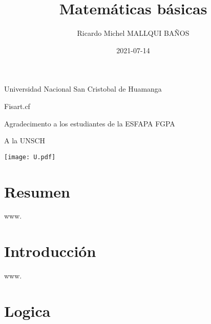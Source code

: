 \documentclass[16pt,]{krantz}
\title{Matemáticas básicas}
\author{Ricardo Michel MALLQUI BAÑOS}
\institute{Universidad Nacional San Cristóbal De Huamanga}
\date{2021-07-14}
\theoremstyle{definition}
\theoremstyle{definition}
\theoremstyle{definition}
\theoremstyle{definition}
\theoremstyle{remark}
\begin{document}
\maketitle

\thispagestyle{empty}
\begin{flushright}
Universidad Nacional San Cristobal de Huamanga

Fisart.cf

Agradecimento a los estudiantes de la ESFAPA FGPA

A la UNSCH

\texttt{[image: U.pdf]}
\end{flushright}

{
\hypersetup{linkcolor=}
\setcounter{tocdepth}{2}
\tableofcontents
}
\listoftables
\listoffigures
\newcommand{\N}{\mathbb{N}}
\newcommand{\R}{\mathbb{R}}
\newcommand{\CC}{\mathbb{C}}
\newcommand{\I}{\mathbb{I}}
\newcommand{\f}{\mathbb{f}}
\newcommand{\X}{\mathbb{X}}
\newcommand{\D}{\mathbb{D}}
\newcommand{\Z}{\mathbb{Z}}
\newcommand{\Q}{\mathbb{Q}}
\newcommand{\norm}[1]{\left\Vert#1\right\Vert}
\newcommand{\abs}[1]{\left\vert#1\right\vert}
\newcommand{\set}[1]{\left\{#1\right\}}
\newcommand{\seq}[1]{\left<#1\right>}
\newcommand{\co}[1]{\left[#1\right]}
\newcommand{\cc}[1]{\left(#1\right)}
\newcommand{\J}{\mathcal{J}}
\newcommand{\K}{\mathcal{K}}
\newcommand{\M}{\mathcal{M}}
\newcommand{\F}{\mathcal{F}}

\hypertarget{resumen}{%
\chapter*{Resumen}\label{resumen}}


www.

\hypertarget{introducciuxf3n}{%
\chapter*{Introducción}\label{introducciuxf3n}}


www.

\mainmatter

\hypertarget{logica}{%
\chapter{Logica}\label{logica}}
\end{document}
